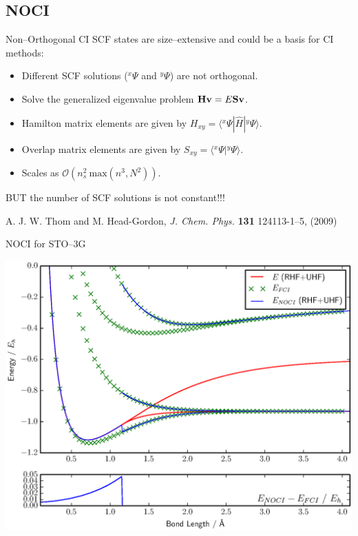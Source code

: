 \documentclass{beamer}
\newcommand{\braket}[3] {{\langle #1 | #2 | #3 \rangle}}
\newcommand{\brket}[2] {{\langle #1 | #2  \rangle}}
\newcommand{\up}[2] {{^{#1}\!#2}}
\begin{document}
\subsection{NOCI}
\begin{frame}{Non--Orthogonal CI}
SCF states are size--extensive and could be a basis for CI methods:
\vspace{1em}
 \begin{itemize}
  \item Different SCF solutions ($\up{x}{\Psi}$ and $\up{y}{\Psi}$) are \alert{not orthogonal}.
  \item Solve the generalized eigenvalue problem ${\bf H v}=E{\bf S v}$.
  \item Hamilton matrix elements are given by $H_{xy}=\braket{\up{x}\Psi}{\hat H}{\up y\Psi}$.
  \item Overlap matrix elements are given by $S_{xy}=\brket{\up{x}\Psi}{\up y\Psi}$.
  \item Scales as $\mathcal{O}\left( n_s^2\ \mathrm{max}\left(n^3, N^2\right) \right).$
 \end{itemize}
 \vspace{0.5em}
   \begin{center} 
BUT the number of SCF solutions is \alert{not constant}!!!
  \end{center}
\vspace{0.5em} 
{\tiny A. J. W. Thom and M. Head-Gordon, {\it J. Chem. Phys.} {\bf 131} 124113-1--5, (2009)}
\end{frame}

\begin{frame}{NOCI for  STO--3G}
  \begin{center}
  \includegraphics[scale=0.4]{H2_normal}
  \end{center}
\end{frame}
\end{document}
